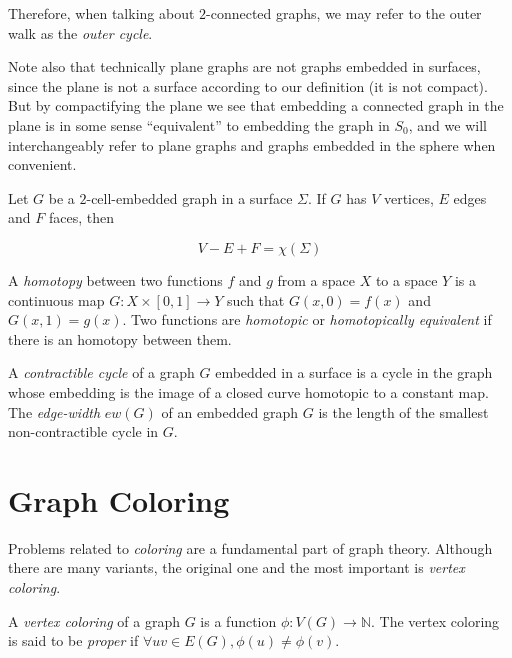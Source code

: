 Therefore, when talking about $2$-connected graphs, we may refer to the outer walk as the 
\emph{outer cycle}.

Note also that technically plane graphs are not graphs embedded in surfaces, since the plane is
not a surface according to our definition (it is not compact). But by compactifying the plane
we see that embedding a connected graph in the plane is in some sense ``equivalent'' to embedding 
the graph in $S_0$, and we will interchangeably refer to plane graphs and graphs embedded in the 
sphere when convenient. 

\begin{theorem}
Let $G$ be a $2$-cell-embedded graph in a surface $\Sigma$. If $G$ has $V$ vertices, $E$ edges and 
$F$ faces, then

\[
V - E + F = \chi(\Sigma)
\]
\end{theorem}

\begin{definition}
A \emph{homotopy} between two functions $f$ and $g$ from a space $X$ to a space $Y$ is a continuous
map $G : X \times [0, 1] \rightarrow Y$ such that $G(x, 0) = f(x)$ and $G(x, 1) = g(x)$. 
Two functions are \emph{homotopic} or \emph{homotopically equivalent} if there is an homotopy
between them. 
\end{definition}

\begin{definition}
A \emph{contractible cycle} of a graph $G$ embedded in a surface is a cycle in the graph whose 
embedding is the image of a closed curve homotopic to a constant map.
The \emph{edge-width} $ew(G)$ of an embedded graph $G$ 
is the length of the smallest non-contractible cycle in $G$. 
\end{definition}





\section{Graph Coloring}

Problems related to \emph{coloring} are a fundamental part of graph theory. Although there are many variants, the original one and the most important is \emph{vertex coloring}.

\begin{definition}
A \emph{vertex coloring} of a graph $G$ is a function $\phi : V(G) \rightarrow \mathbb{N}$. The vertex coloring is said to be \emph{proper} if $\forall uv \in E(G), \phi(u) \neq \phi(v)$. 
\end{definition}

